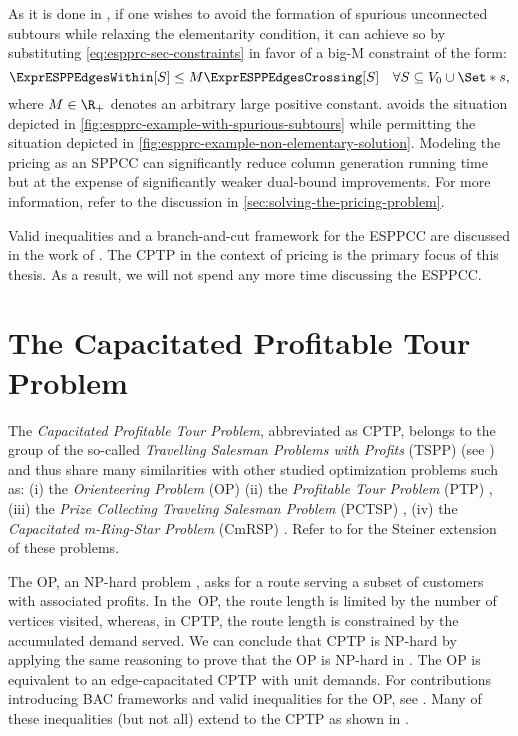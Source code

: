 As it is done in \textcite{beasley1989},
if one wishes to avoid the formation of spurious unconnected subtours
while relaxing the elementarity condition,
it can achieve so by substituting \cref{eq:espprc-sec-constraints} in favor
of a big-M constraint of the form:
\begin{equation}
	\label{eq:espprc-relaxed-elementarity}
	\ExprESPPEdgesWithin[S] \le M \ExprESPPEdgesCrossing[S] \quad \forall S \subseteq V_0 \cup \Set*{s},
\end{equation}
where $M \in \R_+$ denotes an arbitrary large positive constant.
 avoids the situation depicted
in \cref{fig:espprc-example-with-spurious-subtours}
while permitting the situation depicted in \cref{fig:espprc-example-non-elementary-solution}.
Modeling the pricing as an SPPCC can significantly reduce column generation running time
but at the expense of significantly weaker dual-bound improvements.
For more information, refer to the discussion in \cref{sec:solving-the-pricing-problem}.

Valid inequalities and a branch-and-cut framework for the ESPPCC
are discussed in the work of \textcite{jepsen2008branchandcut}.
The CPTP in the context of pricing is the primary focus of this thesis.
As a result, we will not spend any more time discussing the ESPPCC.

\section{The Capacitated Profitable Tour Problem}
\label{sec:the-capacitated-profitable-tour-problem}

The \textit{Capacitated Profitable Tour Problem}, abbreviated as CPTP,
belongs to the group of the so-called
\textit{Travelling Salesman Problems with Profits} (TSPP) (see \cite{feillet2005})
and thus share many similarities with other studied optimization problems such as:
(i) the \textit{Orienteering Problem} (OP) \parencite{golden1987, laporte1990}
(ii) the \textit{Profitable Tour Problem} (PTP) \parencite{dellamico1995},
(iii) the \textit{Prize Collecting Traveling Salesman Problem} (PCTSP) \parencite{balas1989prize, balas1995prize},
(iv) the \textit{Capacitated m-Ring-Star Problem} (CmRSP) \parencite{baldacci2007capacitated}.
Refer to \textcite{letchford2013} for the Steiner extension of these problems.

The OP, an NP-hard problem \parencite{laporte1990}, asks for a route serving
a subset of customers with associated profits.
In the OP, the route length is limited by the number of vertices visited,
whereas, in CPTP,
the route length is constrained by the accumulated demand served.
We can conclude that CPTP is NP-hard by applying the same reasoning
to prove that the OP is NP-hard in \textcite{laporte1990}.
The OP is equivalent to an edge-capacitated CPTP with unit demands.
For contributions introducing BAC frameworks and valid inequalities for the OP,
see \textcite{fischetti1998, gendreau1998}.
Many of these inequalities (but not all) extend to the CPTP as shown in \textcite{jepsen2014}.

